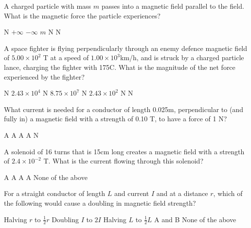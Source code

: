 \documentclass[letter,12pt]{exam}
\begin{document}
\begin{questions}

\question A charged particle with mass $m$ passes into a magnetic field parallel to the field. What is the magnetic force the particle experiences?

\begin{oneparchoices}
     N
    \choice $+ \infty$
    \choice $- \infty$
    \choice $m$ N
     N
\end{oneparchoices}

\question A space fighter is flying perpendicularly through an enemy defence magnetic field of $5.00 \times 10^2$ T at a speed of $1.00 \times 10^3$km/h, and is struck by a charged particle lance, charging the fighter with 175C. What is the magnitude of the net force experienced by the fighter?

\begin{oneparchoices}
     N
    \choice $2.43 \times 10^4$ N
    \choice $8.75 \times 10^7$ N
    \choice $2.43 \times 10^2$ N
     N
\end{oneparchoices}

\question What current is needed for a conductor of length 0.025m, perpendicular to (and fully in) a magnetic field with a strength of 0.10 T, to have a force of 1 N?

\begin{oneparchoices}
     A
     A
     A
     A
     N
\end{oneparchoices}

\question A solenoid of 16 turns that is 15cm long creates a magnetic field with a strength of $2.4 \times 10^{-2}$ T. What is the current flowing through this solenoid?

\begin{oneparchoices}
     A
     A
     A
     A
    \choice None of the above
\end{oneparchoices}

\question For a straight conductor of length $L$ and current $I$ and at a distance $r$, which of the following would cause a doubling in magnetic field strength?

\begin{oneparchoices}
    \choice Halving $r$ to $\frac{1}{2}r$
    \choice Doubling $I$ to $2I$
    \choice Halving $L$ to $\frac{1}{2}L$
    \choice A and B
    \choice None of the above
\end{oneparchoices}

\end{questions}
\end{document}
